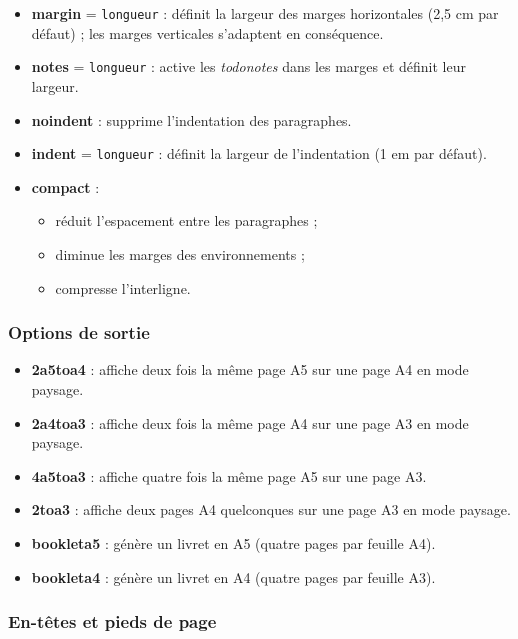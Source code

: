 \documentclass[
    french,
    margin=2cm
]{neoschool}
\begin{document}
\begin{itemize}
\item \textbf{margin} = \texttt{longueur} : définit la
  largeur des marges horizontales (2,5 cm par défaut) ; les marges verticales s'adaptent en conséquence.
\item \textbf{notes} = \texttt{longueur} : active les \textit{todonotes}
  dans les marges et définit leur largeur.
\item \textbf{noindent} : supprime l'indentation des paragraphes.
\item \textbf{indent} = \texttt{longueur} : définit la
  largeur de l'indentation (1 em par défaut).
\item \textbf{compact} :
  \begin{itemize}
  \item réduit l'espacement entre les paragraphes ;
  \item diminue les marges des environnements ;
  \item compresse l'interligne.
  \end{itemize}
\end{itemize}

\subsubsection{Options de sortie}

\begin{itemize}
\item \textbf{2a5toa4} : affiche deux fois la même page A5 sur une page A4 en mode paysage.
\item \textbf{2a4toa3} : affiche deux fois la même page A4 sur une page A3 en mode paysage.
\item \textbf{4a5toa3} : affiche quatre fois la même page A5 sur une page A3.
\item \textbf{2toa3} : affiche deux pages A4 quelconques sur une page A3 en mode paysage.
\item \textbf{bookleta5} : génère un livret en A5 (quatre pages par feuille A4).
\item \textbf{bookleta4} : génère un livret en A4 (quatre pages par feuille A3).
\end{itemize}

\subsubsection{En-têtes et pieds de page}
\end{document}
